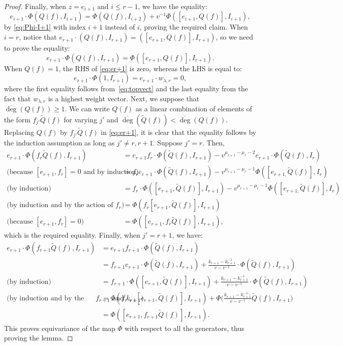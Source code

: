 \documentclass[10pt,a4paper]{amsart}
\newcommand{\ol}{\overline}
\begin{document}
\begin{proof}
Finally, when $z=e_{i+1}$ and $i\leq r-1$, we have the equality:
\[e_{i+1}\cdot\Phi( Q(f),I_{i+1}) = \Phi(Q(f),I_{i+2})+v^{-1}\Phi([e_{i+1},Q(f)], I_{i+1}),\]
by \eqref{eq:Phi-I+1} with index $i+1$ instead of $i$, proving the required claim. When $i=r$, notice that $e_{r+1}\cdot (Q(f), I_{r+1}) = ([e_{r+1},Q(f)], I_{r+1})$, so we need to prove the equality:
\begin{equation}\label{eq:er+1}e_{r+1}\cdot \Phi(Q(f), I_{r+1}) = \Phi([e_{r+1},Q(f)], I_{r+1}).\end{equation}
When $Q(f)=1$, the RHS of \eqref{eq:er+1} is zero, whereas the LHS is equal to:
\[e_{r+1}\cdot \Phi(1, I_{r+1})= e_{r+1}\cdot w_{\lambda,r}=0,\]
where the first equality follows from~\eqref{eq:topvect} and the last equality from the fact that $w_{\lambda,r}$ is a highest weight vector. %
Next, we suppose that $\ol\deg(Q(f))\geq 1$. We can write $Q(f)$ as a linear combination of elements of the form $f_{j'}\widetilde Q(f)$ for varying $j'$ and $\ol\deg(\widetilde Q(f))< \ol\deg(Q(f))$. Replacing $Q(f)$ by $f_{j'}\widetilde Q(f)$ in \eqref{eq:er+1}, it is clear that the equality follows by the induction assumption as long as $j'\neq r,r+1$. Suppose $j'=r$. Then,
\begin{align*}
e_{r+1}\cdot \Phi(f_{r}\widetilde Q(f), I_{r+1})&=e_{r+1}f_{r}\cdot \Phi(\widetilde Q(f), I_{r+1}) - v^{\mu_{r+1}-\mu_r-2}e_{r+1}\cdot\Phi(\widetilde{Q}(f),I_r)\\
\text{(because $[e_{r+1},f_r]=0$ and by induction) }&=f_{r}e_{r+1}\cdot \Phi(\widetilde Q(f), I_{r+1}) - v^{\mu_{r+1}-\mu_r-1}\Phi([e_{r+1,}\widetilde{Q}(f)],I_r)\\
\text{(by induction) }&=f_{r}\cdot \Phi([e_{r+1},\widetilde Q(f)], I_{r+1}) - v^{\mu_{r+1}-\mu_r-1}\Phi([e_{r+1,}\widetilde{Q}(f)],I_r)\\
\text{(by induction and by the action of $f_r$) }&=\Phi(f_r[e_{r+1},\widetilde Q(f)], I_{r+1})\\
\text{(because $[e_{r+1},f_r]=0$) }&=\Phi([e_{r+1},f_r\widetilde Q(f)], I_{r+1}),
\end{align*}
which is the required equality. Finally, when $j'=r+1$, we have:
\begin{align*}
e_{r+1}\cdot \Phi(f_{r+1}\widetilde Q(f), I_{r+1})&=e_{r+1}f_{r+1}\cdot \Phi(\widetilde Q(f), I_{r+1})\\
&=f_{r+1}e_{r+1}\cdot \Phi(\widetilde Q(f), I_{r+1}) + \frac{k_{r+1}-k_{r+1}^{-1}}{v-v^{-1}}\cdot \Phi(\widetilde Q(f), I_{r+1})\\
\text{(by induction) }&=f_{r+1}\cdot \Phi([e_{r+1},\widetilde Q(f)], I_{r+1}) + \frac{k_{r+1}-k_{r+1}^{-1}}{v-v^{-1}}\cdot \Phi(\widetilde Q(f), I_{r+1})\\
\text{(by induction and by the actions of $f_{r+1}$ and $k_{r+1}$) }&=\Phi(f_{r+1}[e_{r+1},\widetilde Q(f)], I_{r+1}) + \Phi\Big(\frac{k_{r+1}-k_{r+1}^{-1}}{v-v^{-1}}\widetilde Q(f), I_{r+1}\Big)\\
&=\Phi([e_{r+1},f_{r+1}\widetilde Q(f)], I_{r+1}).
\end{align*}
This proves equivariance of the map $\Phi$ with respect to all the generators, thus proving the lemma.
\end{proof}
\end{document}

